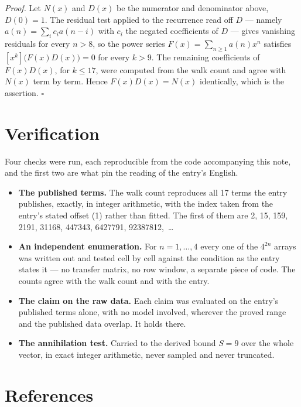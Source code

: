 \documentclass[11pt]{article}
\theoremstyle{definition}
\begin{document}
{\itshape Proof.} Let $N(x)$ and $D(x)$ be the numerator and denominator above, $D(0)=1$. The residual test applied to the recurrence read off $D$ --- namely $a(n) = \sum_i c_i a(n-i)$ with $c_i$ the negated coefficients of $D$ --- gives vanishing residuals for every $n > 8$, so the power series $F(x)=\sum_{n\ge 1}a(n)x^n$ satisfies $[x^k]\bigl(F(x)D(x)\bigr) = 0$ for every $k > 9$. The remaining coefficients of $F(x)D(x)$, for $k \le 17$, were computed from the walk count and agree with $N(x)$ term by term. Hence $F(x)D(x) = N(x)$ identically, which is the assertion. $\square$

\section{Verification}

Four checks were run, each reproducible from the code accompanying this note, and the first two are what pin the reading of the entry's English.

\begin{itemize}

\item {\bfseries The published terms.} The walk count reproduces all 17 terms the entry publishes, exactly, in integer arithmetic, with the index taken from the entry's stated offset (1) rather than fitted. The first of them are 2, 15, 159, 2191, 31168, 447343, 6427791, 92387812,~\dots

\item {\bfseries An independent enumeration.} For $n = 1,\dots,4$ every one of the $4^{2n}$ arrays was written out and tested cell by cell against the condition as the entry states it --- no transfer matrix, no row window, a separate piece of code. The counts agree with the walk count and with the entry.

\item {\bfseries The claim on the raw data.} Each claim was evaluated on the entry's published terms alone, with no model involved, wherever the proved range and the published data overlap. It holds there.

\item {\bfseries The annihilation test.} Carried to the derived bound $S = 9$ over the whole vector, in exact integer arithmetic, never sampled and never truncated.

\end{itemize}

\section{References}
\end{document}
